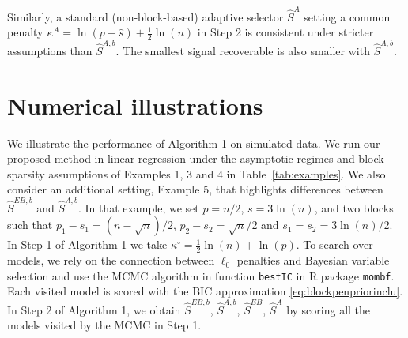 \documentclass[bj,authoryear]{imsart}
\theoremstyle{plain}
\newcommand{\paul}[1]{{\small{\color{green} \sf $\spadesuit$ Paul: #1}}}
\begin{document}
Similarly, a standard (non-block-based) adaptive selector $\hat S^{A}$ setting a common penalty $\kappa^{A}=\ln(p-\hat{s})+ \tfrac{1}{2}\ln(n)$ in Step 2 is consistent under stricter assumptions than $\hat S^{A,b}$. The smallest signal recoverable is also smaller with $\hat S^{A,b}$. %



\section{Numerical illustrations}\label{sec:simulation}

We illustrate the performance of Algorithm 1 on simulated data. We run our proposed method in linear regression under the asymptotic regimes and block sparsity assumptions of Examples 1, 3 and 4 in Table~\ref{tab:examples}. We also consider an additional setting, Example 5, that highlights differences between $\hat S^{EB,b}$ and $\hat S^{A,b}$. In that example, we set $p=n/2$, $s=3\ln(n)$, and two blocks such that $p_1-s_1=(n-\sqrt{n})/2$, $p_2-s_2=\sqrt{n}/2$ and $s_1 = s_2=3\ln(n)/2$. In Step 1 of Algorithm 1 we take $\kappa^{\circ}=\tfrac12\ln(n)+\ln(p)$. 
To search over models, we rely on 
the connection between $\ell_0$ penalties and Bayesian variable selection and %
use the MCMC algorithm in function \texttt{bestIC} in R package \texttt{mombf}. Each visited model is 
scored with the BIC approximation \eqref{eq:blockpenpriorinclu}. In Step 2 of Algorithm 1, we obtain $\hat S^{EB,b}$, $\hat S^{A,b}$, $\hat S^{EB}$, $\hat S^{A}$ by scoring all the models visited by the MCMC in Step 1.
\end{document}
